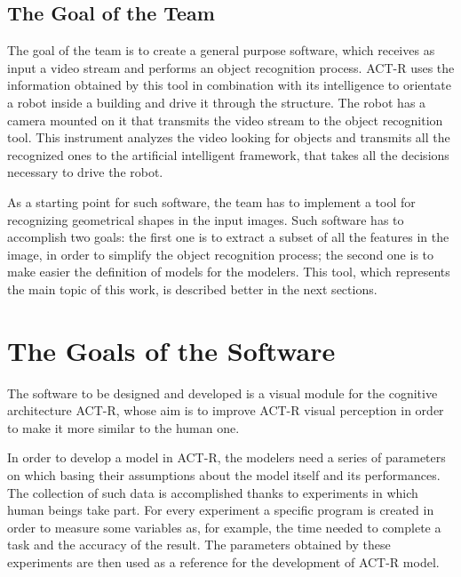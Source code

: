 		\subsection{The Goal of the Team}\label{goalTeam}
		The goal of the team is to create a general purpose software, which receives as input a video stream and performs an object recognition process. \mbox{ACT-R} uses the information obtained by this tool in combination with its intelligence to orientate a robot inside a building and drive it through the structure. The robot has a camera mounted on it that transmits the video stream to the object recognition tool. This instrument analyzes the video looking for objects and transmits all the recognized ones to the artificial intelligent framework, that takes all the decisions necessary to drive the robot. 
	
		As a starting point for such software, the team has to implement a tool for recognizing geometrical shapes in the input images. Such software has to accomplish two goals: the first one is to extract a subset of all the features in the image, in order to simplify the object recognition process; the second one is to make easier the definition of models for the modelers. This tool, which represents the main topic of this work, is described better in the next sections. 

	\section{The Goals of the Software}\label{TeamGoal}
	The software to be designed and developed is a visual module for the cognitive architecture ACT-R, whose aim is to improve ACT-R visual perception in order to make it more similar to the human one. 
	
	In order to develop a model in ACT-R, the modelers need a series of parameters on which basing their assumptions about the model itself and its performances.
	The collection of such data is accomplished thanks to experiments in which human beings take part. 
	For every experiment a specific program is created in order to measure some variables as, for example, the time needed to complete a task and the accuracy of the result.
	The parameters obtained by these experiments are then used as a reference for the development of ACT-R model.

